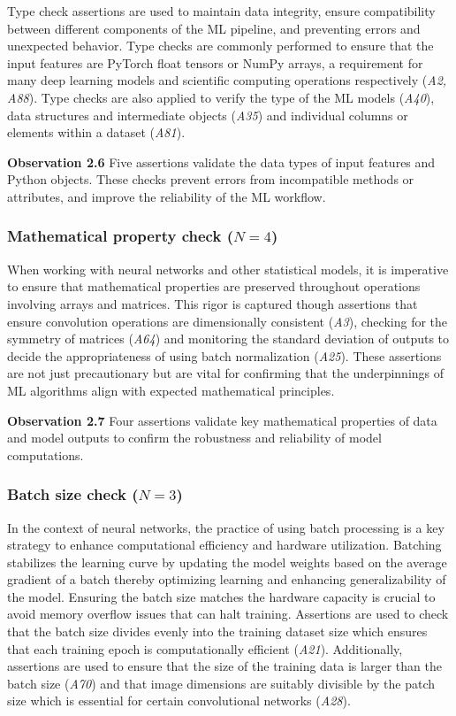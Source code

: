 \documentclass[smallextended]{svjour3}       %
\newcommand{\highlight}[1]{\begin{framed}%
  \noindent#1
\end{framed}}
\begin{document}
Type check assertions are used to maintain data integrity, ensure compatibility between different components of the ML pipeline, and preventing errors and unexpected behavior. Type checks are commonly performed to ensure that the input features are PyTorch float tensors or NumPy arrays, a requirement for many deep learning models and scientific computing operations respectively (\emph{A2, A88}). Type checks are also applied to verify the type of the ML models (\emph{A40}), data structures and intermediate objects (\emph{A35}) and individual columns or elements within a dataset (\emph{A81}).

\highlight{\textbf{Observation 2.6} Five assertions validate the data types of input features and Python objects. These checks prevent errors from incompatible methods or attributes, and improve the reliability of the ML workflow.}

\subsubsection{Mathematical property check ($N = 4$)}

When working with neural networks and other statistical models, it is imperative to ensure that mathematical properties are preserved throughout operations involving arrays and matrices. This rigor is captured though assertions that ensure convolution operations are dimensionally consistent (\emph{A3}), checking for the symmetry of matrices (\emph{A64}) and monitoring the standard deviation of outputs to decide the appropriateness of using batch normalization (\emph{A25}). These assertions are not just precautionary but are vital for confirming that the underpinnings of ML algorithms align with expected mathematical principles.

\highlight{\textbf{Observation 2.7} Four assertions validate key mathematical properties of data and model outputs to confirm the robustness and reliability of model computations.}

\subsubsection{Batch size check ($N = 3$)}

In the context of neural networks, the practice of using batch processing is a key strategy to enhance computational efficiency and hardware utilization. Batching stabilizes the learning curve by updating the model weights based on the average gradient of a batch thereby optimizing learning and enhancing generalizability of the model. Ensuring the batch size matches the hardware capacity is crucial to avoid memory overflow issues that can halt training. Assertions are used to check that the batch size divides evenly into the training dataset size which ensures that each training epoch is computationally efficient (\emph{A21}). Additionally, assertions are used to ensure that the size of the training data is larger than the batch size (\emph{A70}) and that image dimensions are suitably divisible by the patch size which is essential for certain convolutional networks (\emph{A28}).
\end{document}
